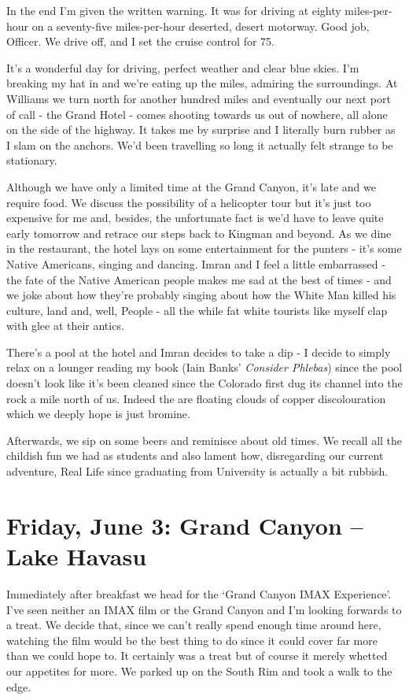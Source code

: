 \documentclass[a5paper,titlepage,draft]{book}
\begin{document}
In the end I'm given the written warning.  It was for driving at eighty miles-per-hour on a seventy-five miles-per-hour deserted, desert motorway.  Good job, Officer.  We drive off, and I set the cruise control for 75.

It's a wonderful day for driving, perfect weather and clear blue skies.  I'm breaking my hat in and we're eating up the miles, admiring the surroundings.  At Williams we turn north for another hundred miles and eventually our next port of call - the Grand Hotel - comes shooting towards us out of nowhere, all alone on the side of the highway.  It takes me by surprise and I literally burn rubber as I slam on the anchors.  We'd been travelling so long it actually felt strange to be stationary.

Although we have only a limited time at the Grand Canyon, it's late and we require food.  We discuss the possibility of a helicopter tour but it's just too expensive for me and, besides, the unfortunate fact is we'd have to leave quite early tomorrow and retrace our steps back to Kingman and beyond.  As we dine in the restaurant, the hotel lays on some entertainment for the punters - it's some Native Americans, singing and dancing.  Imran and I feel a little embarrassed - the fate of the Native American people makes me sad at the best of times - and we joke about how they're probably singing about how the White Man killed his culture, land and, well, People - all the while fat white tourists like myself clap with glee at their antics.

There's a pool at the hotel and Imran decides to take a dip - I decide to simply relax on a lounger reading my book (Iain Banks' \emph{Consider Phlebas}) since the pool doesn't look like it's been cleaned since the Colorado first dug its channel into the rock a mile north of us.  Indeed the are floating clouds of copper discolouration which we deeply hope is just bromine.

Afterwards, we sip on some beers and reminisce about old times.  We recall all the childish fun we had as students and also lament how, disregarding our current adventure, Real Life since graduating from University is actually a bit rubbish.

\chapter[Grand Canyon -- Lake Havasu]{Friday, June 3: Grand Canyon -- Lake Havasu}
Immediately after breakfast we head for the `Grand Canyon IMAX Experience'.  I've seen neither an IMAX film or the Grand Canyon and I'm looking forwards to a treat.  We decide that, since we can't really spend enough time around here, watching the film would be the best thing to do since it could cover far more than we could hope to. It certainly was a treat but of course it merely whetted our appetites for more.  We parked up on the South Rim and took a walk to the edge.
\end{document}
